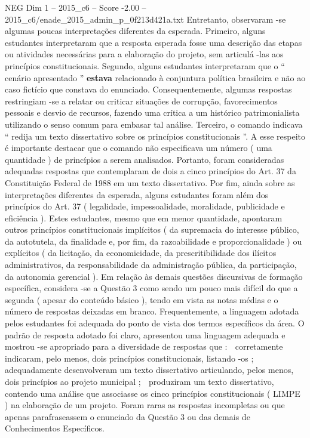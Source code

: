 \begin{textsample}{NEG Dim 1 – 2015\_c6 – Score -2.00 – 2015\_c6/enade\_2015\_admin\_p\_0f213d421a.txt}
Entretanto, observaram -se algumas poucas interpretações diferentes da esperada.
Primeiro, alguns estudantes interpretaram que a resposta esperada fosse uma descrição das etapas ou atividades necessárias para a elaboração do projeto, sem articulá -las aos princípios constitucionais.
Segundo, alguns estudantes interpretaram que o “ cenário apresentado ” \textbf{estava} relacionado à conjuntura política brasileira e não ao caso fictício que constava do enunciado.
Consequentemente, algumas respostas restringiam -se a relatar ou criticar situações de corrupção, favorecimentos pessoais e desvio de recursos, fazendo uma crítica a um histórico patrimonialista utilizando o senso comum para embasar tal análise.
Terceiro, o comando indicava “ redija um texto dissertativo sobre os princípios constitucionais ”.
A esse respeito é importante destacar que o comando não especificava um número ( uma quantidade ) de princípios a serem analisados.
Portanto, foram consideradas adequadas respostas que contemplaram de dois a cinco princípios do Art. 37 da Constituição Federal de 1988 em um texto dissertativo.
Por fim, ainda sobre as interpretações diferentes da esperada, alguns estudantes foram além dos princípios do Art. 37 ( legalidade, impessoalidade, moralidade, publicidade e eficiência ).
Estes estudantes, mesmo que em menor quantidade, apontaram outros princípios constitucionais implícitos ( da supremacia do interesse público, da autotutela, da finalidade e, por fim, da razoabilidade e proporcionalidade ) ou explícitos ( da licitação, da economicidade, da prescritibilidade dos ilícitos administrativos, da responsabilidade da administração pública, da participação, da autonomia gerencial ).
Em relação às demais questões discursivas de formação específica, considera -se a Questão 3 como sendo um pouco mais difícil do que a segunda ( apesar do conteúdo básico ), tendo em vista as notas médias e o número de respostas deixadas em branco.
Frequentemente, a linguagem adotada pelos estudantes foi adequada do ponto de vista dos termos específicos da área.
O padrão de resposta adotado foi claro, apresentou uma linguagem adequada e mostrou -se apropriado para a diversidade de respostas que :  corretamente indicaram, pelo menos, dois princípios constitucionais, listando -os ;  adequadamente desenvolveram um texto dissertativo articulando, pelos menos, dois princípios ao projeto municipal ;  produziram um texto dissertativo, contendo uma análise que associasse os cinco princípios constitucionais ( LIMPE ) na elaboração de um projeto.
Foram raras as respostas incompletas ou que apenas parafraseassem o enunciado da Questão 3 ou das demais de Conhecimentos Específicos.

\end{textsample}

